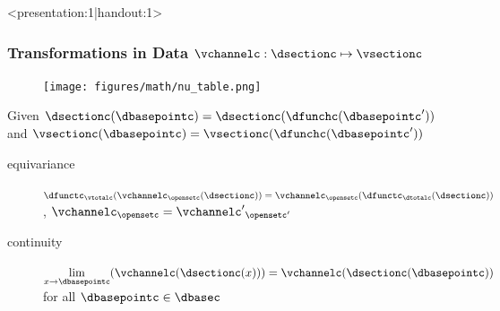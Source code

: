 \documentclass[xcolor={dvipsnames}]{beamer}
\begin{document}
\begin{frame}<presentation:1|handout:1>
    \frametitle{Transformations in Data $\vchannelc: \dsectionc \mapsto \vsectionc$}
    \begin{figure}
        \texttt{[image: figures/math/nu\_table.png]}
    \end{figure}
    Given $\dsectionc(\dbasepointc) = \dsectionc(\dfunchc(\dbasepointc^{\prime}))$ and  $\vsectionc(\dbasepointc) = \vsectionc(\dfunchc(\dbasepointc^{\prime}))$
    \begin{description}
        \item[equivariance] $\dfunctc_{\vtotalc}(\vchannelc_{\opensetc}(\dsectionc))
        = \vchannelc_{\opensetc}(\dfunctc_{\dtotalc}(\dsectionc))$, $\vchannelc_{\opensetc} = {\vchannelc^{\prime}}_{\opensetc^{\prime}}$
        \item[continuity] $\lim\limits_{x\to \dbasepointc}(\vchannelc(\dsectionc(x))) = \vchannelc(\dsectionc(\dbasepointc))$ for all $\dbasepointc \in \dbasec$ 
    \end{description}
\end{frame}  
\end{document}
